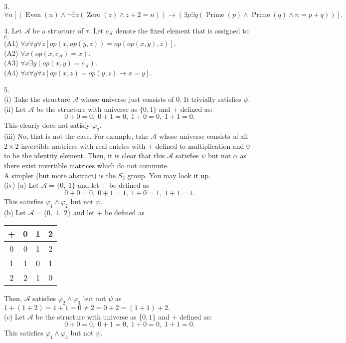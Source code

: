 \documentclass{article}
\begin{document}
\hrulefill

3.
\[\forall n[(\operatorname{Even}(n) \wedge \neg \exists z (\operatorname{Zero}(z) \wedge z + 2 = n)) \to (\exists p \exists q(\operatorname{Prime}(p) \wedge \operatorname{Prime}(q) \wedge n = p + q))].\]

\hrulefill

4. Let $\mathcal{A}$ be a structure of $\tau.$ Let $c_\mathcal{A}$ denote the fixed element that is assigned to $c.$\\
(A1) $\forall x\forall y\forall z[op(x, op(y, z)) = op(op(x, y), z)].$\\
(A2) $\forall x(op(x, c_\mathcal{A}) = x).$\\
(A3) $\forall x \exists y(op(x, y) = c_\mathcal{A}).$\\
(A4) $\forall x\forall y\forall z[op(x, z) = op(y, z) \to x = y].$\\

\hrulefill

5. \\
(i) Take the structure $\mathcal{A}$ whose universe just consists of $0.$ It trivially satisfies $\psi.$\\
(ii) Let $\mathcal{A}$ be the structure with universe as $\{0, 1\}$ and $+$ defined as:
\[0+0 = 0,\; 0+1 = 0, \; 1+0 = 0, \; 1+1=0.\]
This clearly does not satisfy $\varphi_2.$\\
(iii) No, that is not the case. For example, take $\mathcal{A}$ whose universe consists of all $2\times2$ invertible matrices with real entries with $+$ defined to multiplication and $0$ to be the identity element. Then, it is clear that this $\mathcal{A}$ satisfies $\psi$ but not $\alpha$ as there exist invertible matrices which do not commute.\\
A simpler (but more abstract) is the $S_3$ group. You may look it up.\\
(iv) (a) Let $\mathcal{A} = \{0,\;1\}$ and let $+$ be defined as
\[0+0 = 0,\; 0+1 = 1, \; 1+0 = 1, \; 1+1=1.\]
This satisfies $\varphi_1 \wedge \varphi_2$ but not $\psi.$\\
(b) Let $\mathcal{A} = \{0,\;1,\;2\}$ and let $+$ be defined as
\begin{center}
	\begin{tabular}{|c|c|c|c|}
	\hline
	+ & 0 & 1 & 2 \\
	\hline
	0 & 0 & 1 & 2 \\
	\hline
	1 & 1 & 0 & 1 \\
	\hline
	2 & 2 & 1 & 0 \\
	\hline  
	\end{tabular}
\end{center}
Then, $\mathcal{A}$ satisfies $\varphi_2 \wedge \varphi_3$ but not $\psi$ as $1 + (1 + 2) = 1 + 1 = 0 \neq 2 = 0 + 2 = (1 + 1) + 2.$\\
(c) Let $\mathcal{A}$ be the structure with universe as $\{0, 1\}$ and $+$ defined as:
\[0+0 = 0,\; 0+1 = 0, \; 1+0 = 0, \; 1+1=0.\]
This satisfies $\varphi_1 \wedge \varphi_3$ but not $\psi.$
\end{document}

